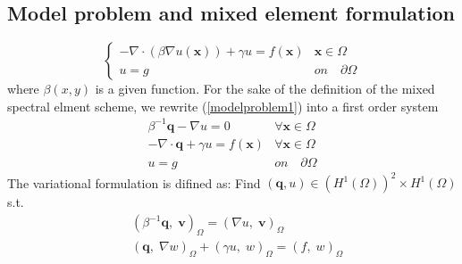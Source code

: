 \documentclass[10pt,reqno, final]{amsart}
\newcommand{\bs}[1]{\boldsymbol{#1}}
\begin{document}
%

\subsection{Model problem and mixed element formulation}
\begin{equation}
\label{modelproblem1}
\left\{\begin{array}{ll}\displaystyle -\nabla\cdot(\beta\nabla
u(\bs x))  +\gamma u   =    f(\bs x)&\displaystyle \bs x\in\Omega\\
\displaystyle u=g &\displaystyle on\quad \partial\Omega
\end{array}\right.
\end{equation}
where $\beta(x,y)$ is a given function. For the sake of the definition of the mixed spectral elment scheme, we rewrite (\ref{modelproblem1})
into a first order system
\begin{eqnarray}
\beta^{-1}{\bs q}-\nabla u=0 & \forall \bs x\in \Omega\nonumber\\
-\nabla\cdot{\bs q}  +\gamma u   =f(\bs x) & \forall \bs x\in \Omega\label{firstordersystem1}\\
u=g & on\quad \partial\Omega\nonumber
\end{eqnarray}
The variational formulation is difined as: Find $(\bs q, u)\in (H^1(\Omega))^2\times H^1(\Omega)$ s.t.
\begin{eqnarray}
&(\beta^{-1}{\bs q}, \;\bs v)_{\Omega}  =(\nabla u, \;\bs v)_{\Omega}\nonumber\\
&({\bs q},\;\nabla w)_{\Omega}  + (\gamma u,\; w)_{\Omega}  = (f,\; w)_{\Omega}  \label{variationalform1}
\end{eqnarray}
\end{document}

